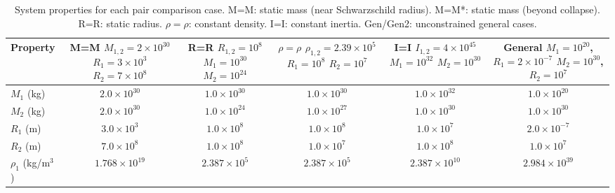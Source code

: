 \begin{table}[ht]
\centering
\caption{System properties for each pair comparison case. M=M: static mass (near Schwarzschild radius). M=M*: static mass (beyond collapse). R=R: static radius. $\rho=\rho$: constant density. I=I: constant inertia. Gen/Gen2: unconstrained general cases.}
\label{tab:pair_properties}
\scriptsize
\begin{tabular}{@{} l c c c c c @{}}
\toprule
\textbf{Property} & \makecell{\textbf{M=M} \\ \scriptsize $M_{1,2}\!=\!2\!\times\!10^{30}$ \\ \scriptsize $R_1\!=\!3\!\times\!10^{3}$ \\ \scriptsize $R_2\!=\!7\!\times\!10^{8}$} & \makecell{\textbf{R=R} \\ \scriptsize $R_{1,2}\!=\!10^{8}$ \\ \scriptsize $M_1\!=\!10^{30}$ \\ \scriptsize $M_2\!=\!10^{24}$} & \makecell{\textbf{$\rho=\rho$} \\ \scriptsize $\rho_{1,2}\!=\!2.39\!\times\!10^{5}$ \\ \scriptsize $R_1\!=\!10^{8}$ \\ \scriptsize $R_2\!=\!10^{7}$} & \makecell{\textbf{I=I} \\ \scriptsize $I_{1,2}\!=\!4\!\times\!10^{45}$ \\ \scriptsize $M_1\!=\!10^{32}$ \\ \scriptsize $M_2\!=\!10^{30}$} & \makecell{\textbf{General} \\ \scriptsize $M_1\!=\!10^{20}$, $R_1\!=\!2\!\times\!10^{-7}$ \\ \scriptsize $M_2\!=\!10^{30}$, $R_2\!=\!10^{7}$} \\
\midrule
$M_1$ (kg) & $2.0 \times 10^{30}$ & $1.0 \times 10^{30}$ & $1.0 \times 10^{30}$ & $1.0 \times 10^{32}$ & $1.0 \times 10^{20}$ \\
$M_2$ (kg) & $2.0 \times 10^{30}$ & $1.0 \times 10^{24}$ & $1.0 \times 10^{27}$ & $1.0 \times 10^{30}$ & $1.0 \times 10^{30}$ \\
$R_1$ (m) & $3.0 \times 10^{3}$ & $1.0 \times 10^{8}$ & $1.0 \times 10^{8}$ & $1.0 \times 10^{7}$ & $2.0 \times 10^{-7}$ \\
$R_2$ (m) & $7.0 \times 10^{8}$ & $1.0 \times 10^{8}$ & $1.0 \times 10^{7}$ & $1.0 \times 10^{8}$ & $1.0 \times 10^{7}$ \\
$\rho_1$ (kg/m$^3$) & $1.768 \times 10^{19}$ & $2.387 \times 10^{5}$ & $2.387 \times 10^{5}$ & $2.387 \times 10^{10}$ & $2.984 \times 10^{39}$ \\

\end{tabular}
\end{table}
